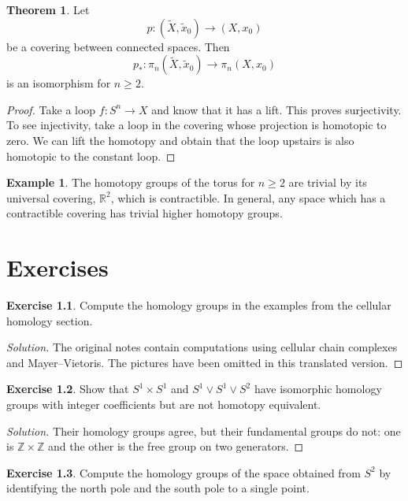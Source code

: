 \documentclass{book}
\theoremstyle{definition}
\newtheorem*{teo}{Theorem}
\newtheorem*{ejer}{Exercise}
\newtheorem*{ejem}{Example}
\newcommand{\R}{\mathbb{R}}
\newcommand{\Z}{\mathbb{Z}}
\begin{document}
\begin{teo}
Let
$$
p:(\tilde X,\tilde x_0)\to(X,x_0)
$$
be a covering between connected spaces. Then
$$
p_*:\pi_n(\tilde X,\tilde x_0)\to\pi_n(X,x_0)
$$
is an isomorphism for $n\geq2$.
\end{teo}

\begin{proof}
Take a loop $f:S^n\to X$ and know that it has a lift. This
proves surjectivity. To see injectivity, take a loop in the
covering whose projection is homotopic to zero. We can lift
the homotopy and obtain that the loop upstairs is also
homotopic to the constant loop.
\end{proof}

\begin{ejem}
The homotopy groups of the torus for $n\geq2$ are trivial by
its universal covering, $\R^2$, which is contractible. In
general, any space which has a contractible covering has
trivial higher homotopy groups.
\end{ejem}

\chapter{Exercises}

\begin{ejer}
Compute the homology groups in the examples from the cellular
homology section.
\end{ejer}

\begin{proof}[Solution]
The original notes contain computations using cellular chain
complexes and Mayer--Vietoris. The pictures have been omitted
in this translated version.
\end{proof}

\begin{ejer}\label{ejer:homol-homot}
Show that $S^1\times S^1$ and $S^1\vee S^1\vee S^2$ have
isomorphic homology groups with integer coefficients but are
not homotopy equivalent.
\end{ejer}

\begin{proof}[Solution]
Their homology groups agree, but their fundamental groups do
not: one is $\Z\times\Z$ and the other is the free group on
two generators.
\end{proof}

\begin{ejer}
Compute the homology groups of the space obtained from
$S^2$ by identifying the north pole and the south pole to a
single point.
\end{ejer}
\end{document}

